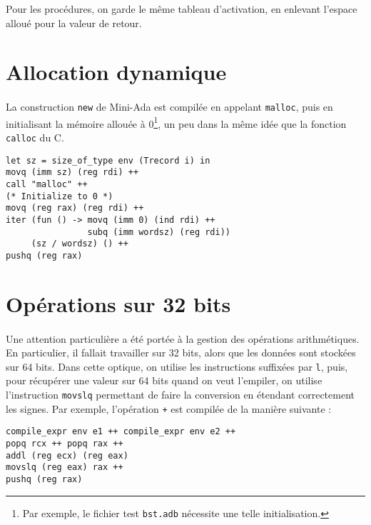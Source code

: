 \documentclass[a4paper,12pt]{article}
\begin{document}
Pour les procédures, on garde le même tableau d'activation, en enlevant l'espace alloué pour la valeur de retour.

\section{Allocation dynamique}

\paragraph*{}
La construction \texttt{new} de Mini-Ada est compilée en appelant \texttt{malloc}, puis en initialisant la mémoire allouée à 0\footnote{Par exemple, le fichier
test \texttt{bst.adb} nécessite une telle initialisation.}, un peu dans la même idée que la fonction \texttt{calloc} du C.

\begin{lstlisting}
let sz = size_of_type env (Trecord i) in
movq (imm sz) (reg rdi) ++
call "malloc" ++
(* Initialize to 0 *)
movq (reg rax) (reg rdi) ++
iter (fun () -> movq (imm 0) (ind rdi) ++
                subq (imm wordsz) (reg rdi))
     (sz / wordsz) () ++
pushq (reg rax)
\end{lstlisting}

\section{Opérations sur 32 bits}

\paragraph*{}
Une attention particulière a été portée à la gestion des opérations arithmétiques. En particulier, il fallait travailler sur 32 bits, alors que les données
sont stockées sur 64 bits. Dans cette optique, on utilise les instructions suffixées par \texttt{l}, puis, pour récupérer une valeur sur 64 bits quand on
veut l'empiler, on utilise l'instruction \texttt{movslq} permettant de faire la conversion en étendant correctement les signes. Par exemple, l'opération
\texttt{+} est compilée de la manière suivante : 

\begin{lstlisting}
compile_expr env e1 ++ compile_expr env e2 ++
popq rcx ++ popq rax ++
addl (reg ecx) (reg eax)
movslq (reg eax) rax ++
pushq (reg rax)
\end{lstlisting}
\end{document}
